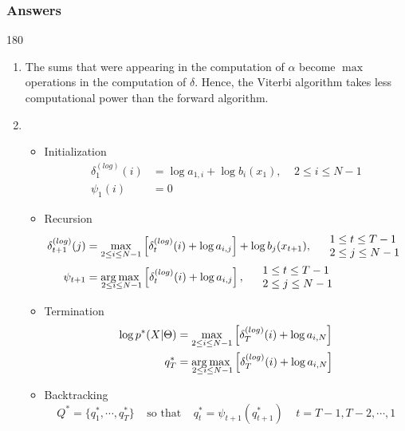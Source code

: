 \documentclass[11pt]{article}
\newenvironment{answer}{\begin{turn}{180}\begin{minipage}[t]{\linewidth}\begin{itshape}}{\end{itshape}\end{minipage}\end{turn}}
\begin{document}
\subsubsection{Answers}
\label{sec:org84dfd4b}
\begin{answer}
\begin{enumerate}
\item The sums that were appearing in the computation of \(\alpha\) become
\(\max\) operations in the computation of \(\delta\). Hence, the Viterbi
algorithm takes less computational power than the forward algorithm.

\item \begin{itemize}
\item Initialization
\begin{align*}
  \delta_1^{(log)}(i) &= \log a_{1,i} + \log b_i(x_1),
  \;\;\;\; 2 \leq i \leq N-1 \\
  \psi_1(i) &= 0
  \end{align*}
\item Recursion
\begin{align*}
  \delta_{t+1}^{(log)}(j) &= \max_{2 \leq i \leq N-1}
      \left[ \delta_{t}^{(log)}(i) + \log a_{i,j} \right]
       + \log b_j(x_{t+1}),
  \;\;\;\; \begin{array}{l} 1 \leq t \leq T-1 \\ 2 \leq j \leq N-1 \end{array}\\
  \psi_{t+1} &= \mbox{arg}\hspace{-0.5ex}\max_{\hspace{-3ex}2 \leq i \leq N-1}
  \left[ \delta_{t}^{(log)}(i) + \log a_{i,j} \right],
  \;\;\;\; \begin{array}{l} 1 \leq t \leq T-1 \\ 2 \leq j \leq N-1 \end{array}
\end{align*}
\item Termination
\begin{align*}
  \log p^*(X|\Theta) &= \max_{2 \leq i \leq N-1}
      \left[ \delta_{T}^{(log)}(i) + \log a_{i,N} \right] \\
  q_T^* &= \mbox{arg}\hspace{-0.5ex}\max_{\hspace{-3ex}2 \leq i \leq N-1}
      \left[ \delta_{T}^{(log)}(i) + \log a_{i,N} \right]
\end{align*}
\item Backtracking
$$
       Q^* = \{q_1^*,\cdots,q_T^*\} \;\;\;\;\mbox{so that}\;\;\;\;
       q_t^* = \psi_{t+1}(q_{t+1}^*) \;\;\;\; t = T-1, T-2, \cdots, 1
     $$
\end{itemize}
\end{enumerate}
\end{answer}
\end{document}
